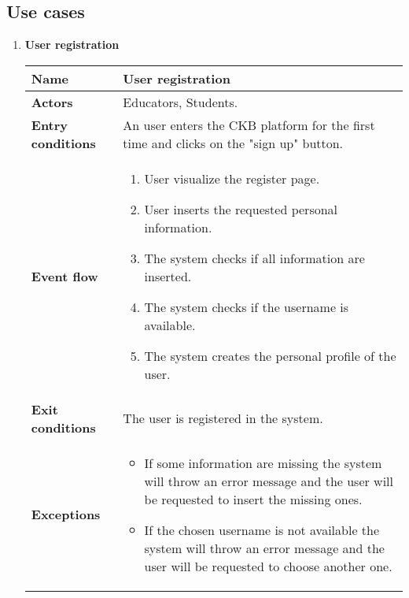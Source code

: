     \clearpage
    
    \subsection{Use cases}
    \begin{enumerate}[series=usecases, label=\textbf{UC.\arabic*}]
        \item {} \textbf{User registration}
        \begin{table}[H]
    	    \centering
                \renewcommand{\arraystretch}{1.5}
                \begin{tabular}{|m{3.2cm}|m{9.8cm}|}
                    \hline
                    \textbf{Name} & User registration \\
                    \hline
                    \textbf{Actors} & Educators, Students. \\
                    \hline
                    \textbf{Entry conditions}  & An user enters the CKB platform for the first time and clicks on the "sign up" button. \\
                    \hline
                    \textbf{Event flow}  & 
                    \begin{enumerate}[label=\arabic*.]
                        \item User visualize the register page.
                        \item User inserts the requested personal information.
                        \item The system checks if all information are inserted.
                        \item The system checks if the username is available.
                        \item The system creates the personal profile of the user.
                    \end{enumerate}\\
                    \hline
                    \textbf{Exit conditions}  & The user is registered in the system. \\
                    \hline
                    \textbf{Exceptions}  & 
                    \begin{itemize}
                        \item If some information are missing the system will throw an error message and the user will be requested to insert the missing ones.
                        \item If the chosen username is not available the system will throw an error message and the user will be requested to choose another one.

\end{itemize}
\end{tabular}
\end{table}
\end{enumerate}
